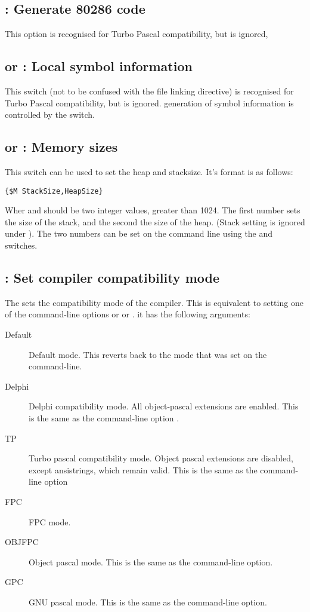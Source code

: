 \documentclass{report}
\begin{document}
\subsection{ : Generate 80286 code}

This option is recognised for Turbo Pascal compatibility, but is ignored,

\subsection{ or : Local symbol information}

This switch (not to be confused with the  file linking
directive) is recognised for Turbo Pascal compatibility, but is ignored.
generation of symbol information is controlled by the  switch.

\subsection{ or : Memory sizes}

This switch can be used to set the heap and stacksize. It's format is as
follows:
\begin{verbatim}
{$M StackSize,HeapSize}
\end{verbatim}
Wher  and  should be two integer values,
greater than 1024. The first number sets the size of the stack, and the
second the size of the heap. (Stack setting is ignored under \linux).
The two numbers can be set on the command line using the 
and  switches.

\subsection{ : Set compiler compatibility mode}

The  sets the compatibility mode of the compiler. This 
is equivalent to setting one of the command-line options  or
 or . it has the following arguments:
\begin{description}
\item[Default] Default mode. This reverts back to the mode that was set on
the command-line.
\item[Delphi] Delphi compatibility mode. All object-pascal extensions are
enabled. This is the same as the command-line option .
\item[TP] Turbo pascal compatibility mode. Object pascal extensions are
disabled, except ansistrings, which remain valid. This is the same as the command-line option 
\item[FPC] FPC mode. 
\item[OBJFPC] Object pascal mode. This is the same as the 
command-line option.
\item[GPC] GNU pascal mode. This is the same as the  command-line
option.
\end{description}
\end{document}
